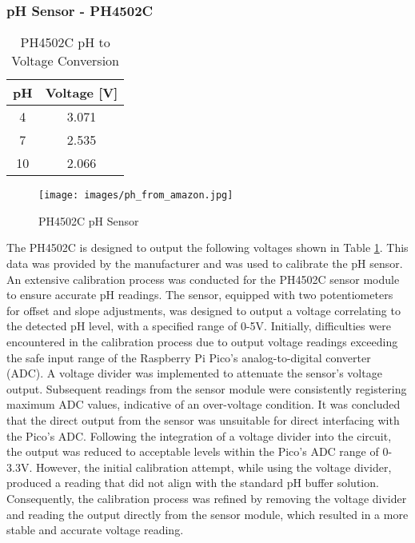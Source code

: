 \documentclass[12pt]{article}
\begin{document}
\subsubsection{pH Sensor - PH4502C}
\begin{table}[H]
    \centering
    \begin{tabular}{|c|c|}
        \hline
        \textbf{pH} & \textbf{Voltage [V]} \\
        \hline
        4 & 3.071\\
        \hline
        7 & 2.535\\
        \hline
        10 & 2.066\\
        \hline
    \end{tabular}
    \caption{PH4502C pH to Voltage Conversion}
    \label{tab:PH4502C}
\end{table}
\begin{figure}[H]
    \centering
    \texttt{[image: images/ph\_from\_amazon.jpg]}
    \caption{PH4502C pH Sensor \cite{ref_ph_amazon}}
    \label{fig:PH4502C}
\end{figure}
\noindent The PH4502C is designed to output the following voltages shown in Table \ref{tab:PH4502C}.
This data was provided by the manufacturer and was used to calibrate the pH sensor. An extensive calibration process was conducted for the PH4502C sensor module to ensure accurate pH readings. The sensor, equipped with two potentiometers for offset and slope adjustments, was designed to output a voltage correlating to the detected pH level, with a specified range of 0-5V.
\newline
\newline
\noindent Initially, difficulties were encountered in the calibration process due to output voltage readings exceeding the safe input range of the Raspberry Pi Pico’s analog-to-digital converter (ADC). A voltage divider was implemented to attenuate the sensor's voltage output. Subsequent readings from the sensor module were consistently registering maximum ADC values, indicative of an over-voltage condition. It was concluded that the direct output from the sensor was unsuitable for direct interfacing with the Pico’s ADC.
Following the integration of a voltage divider into the circuit, the output was reduced to acceptable levels within the Pico's ADC range of 0-3.3V. However, the initial calibration attempt, while using the voltage divider, produced a reading that did not align with the standard pH buffer solution. Consequently, the calibration process was refined by removing the voltage divider and reading the output directly from the sensor module, which resulted in a more stable and accurate voltage reading.
\end{document}
